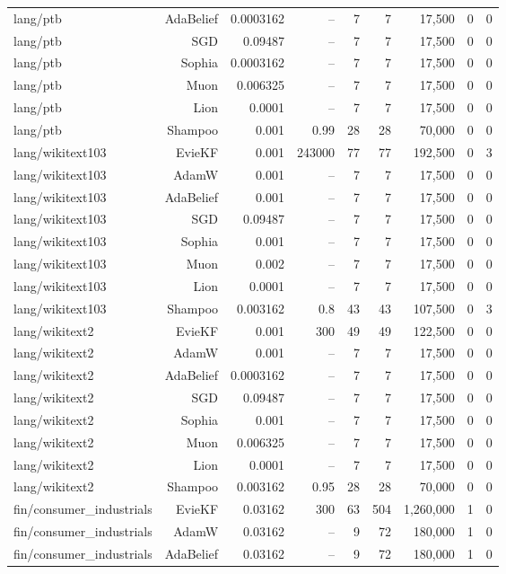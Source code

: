 \begin{table}[t]
\begin{tabular}{lrrrrrrrr}
lang/ptb & AdaBelief & 0.0003162 & -- & 7 & 7 & 17,500 & 0 & 0 \\
lang/ptb & SGD & 0.09487 & -- & 7 & 7 & 17,500 & 0 & 0 \\
lang/ptb & Sophia & 0.0003162 & -- & 7 & 7 & 17,500 & 0 & 0 \\
lang/ptb & Muon & 0.006325 & -- & 7 & 7 & 17,500 & 0 & 0 \\
lang/ptb & Lion & 0.0001 & -- & 7 & 7 & 17,500 & 0 & 0 \\
lang/ptb & Shampoo & 0.001 & 0.99 & 28 & 28 & 70,000 & 0 & 0 \\
lang/wikitext103 & EvieKF & 0.001 & 243000 & 77 & 77 & 192,500 & 0 & 3 \\
lang/wikitext103 & AdamW & 0.001 & -- & 7 & 7 & 17,500 & 0 & 0 \\
lang/wikitext103 & AdaBelief & 0.001 & -- & 7 & 7 & 17,500 & 0 & 0 \\
lang/wikitext103 & SGD & 0.09487 & -- & 7 & 7 & 17,500 & 0 & 0 \\
lang/wikitext103 & Sophia & 0.001 & -- & 7 & 7 & 17,500 & 0 & 0 \\
lang/wikitext103 & Muon & 0.002 & -- & 7 & 7 & 17,500 & 0 & 0 \\
lang/wikitext103 & Lion & 0.0001 & -- & 7 & 7 & 17,500 & 0 & 0 \\
lang/wikitext103 & Shampoo & 0.003162 & 0.8 & 43 & 43 & 107,500 & 0 & 3 \\
lang/wikitext2 & EvieKF & 0.001 & 300 & 49 & 49 & 122,500 & 0 & 0 \\
lang/wikitext2 & AdamW & 0.001 & -- & 7 & 7 & 17,500 & 0 & 0 \\
lang/wikitext2 & AdaBelief & 0.0003162 & -- & 7 & 7 & 17,500 & 0 & 0 \\
lang/wikitext2 & SGD & 0.09487 & -- & 7 & 7 & 17,500 & 0 & 0 \\
lang/wikitext2 & Sophia & 0.001 & -- & 7 & 7 & 17,500 & 0 & 0 \\
lang/wikitext2 & Muon & 0.006325 & -- & 7 & 7 & 17,500 & 0 & 0 \\
lang/wikitext2 & Lion & 0.0001 & -- & 7 & 7 & 17,500 & 0 & 0 \\
lang/wikitext2 & Shampoo & 0.003162 & 0.95 & 28 & 28 & 70,000 & 0 & 0 \\
fin/consumer\_industrials & EvieKF & 0.03162 & 300 & 63 & 504 & 1,260,000 & 1 & 0 \\
fin/consumer\_industrials & AdamW & 0.03162 & -- & 9 & 72 & 180,000 & 1 & 0 \\
fin/consumer\_industrials & AdaBelief & 0.03162 & -- & 9 & 72 & 180,000 & 1 & 0 \\

\end{tabular}
\end{table}
